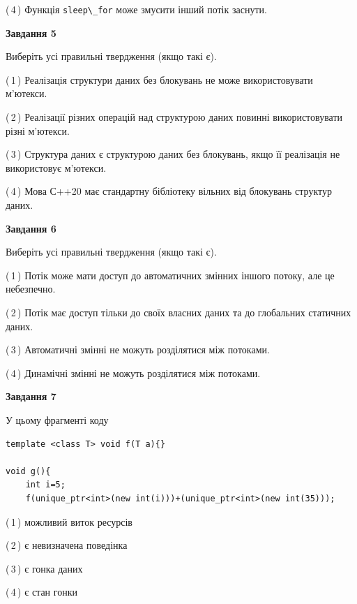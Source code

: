 \documentclass[12pt, ukrainian]{article}
\def\code#1{\Verb!#1!}
\begin{document}
\begin {large}
{(\,4\,) Функція \code{sleep\_for} може змусити інший потік заснути.%


\begin{center}
\textbf{Завдання 5}
\end{center}

Виберіть усі правильні твердження (якщо такі є).\par
\vspace{2mm}

(\,1\,) Реалізація структури даних без блокувань не може використовувати м’ютекси.%

(\,2\,) Реалізації різних операцій над структурою даних повинні використовувати різні м’ютекси.%

(\,3\,) Структура даних є структурою даних без блокувань, якщо її реалізація не використовує м’ютекси.%

(\,4\,) Мова С++20 має стандартну бібліотеку вільних від блокувань структур даних.%
\newpage


\begin{center}
\textbf{Завдання 6}
\end{center}

Виберіть усі правильні твердження (якщо такі є).\par
\vspace{2mm}

(\,1\,) Потік може мати доступ до автоматичних змінних іншого потоку, але це небезпечно.%

(\,2\,) Потік має доступ тільки до своїх власних даних та до глобальних статичних даних.%

(\,3\,) Автоматичні змінні не можуть розділятися між потоками.%

(\,4\,) Динамічні змінні не можуть розділятися між потоками.%


\begin{center}
\textbf{Завдання 7}
\end{center}

У цьому фрагменті коду
\begin{verbatim}
template <class T> void f(T a){}

void g(){
    int i=5;
    f(unique_ptr<int>(new int(i)))+(unique_ptr<int>(new int(35)));
\end{verbatim}
(\,1\,) можливий виток ресурсів%

(\,2\,) є невизначена поведінка%

(\,3\,) є гонка даних%

(\,4\,) є стан гонки%

}
\end {large}

\vspace{4mm}
\newpage
\end{document}

